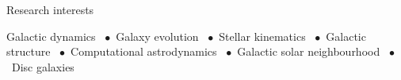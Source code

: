 \begin{rubric}{Research interests}
\begin{minipage}[t]{1\textwidth}
Galactic dynamics \ $\bullet$\  Galaxy evolution \ $\bullet$\  Stellar kinematics \ $\bullet$\  Galactic structure \ $\bullet$\   Computational astrodynamics \ $\bullet$\  Galactic solar neighbourhood \ $\bullet$\  Disc galaxies
\end{minipage}
\end{rubric}